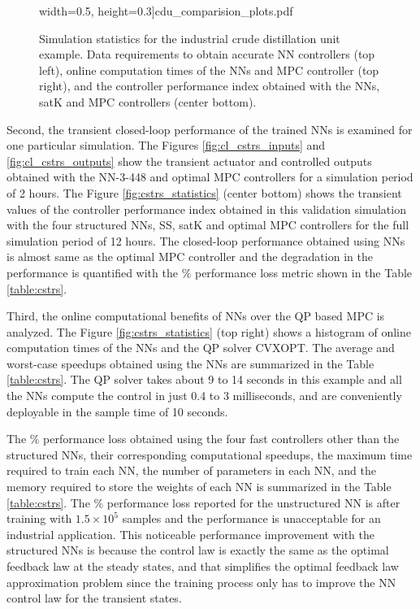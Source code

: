 \documentclass[preprint,5p, twocolumn, authoryear]{elsarticle}
\begin{document}
\begin{figure}[!h]
\begin{center}
        width=0.5\textwidth, 
        height=0.3\textheight]{cdu_comparision_plots.pdf}\end{center}
    \vspace{-0.2in}
    \caption{Simulation statistics for the industrial 
    crude distillation unit example. Data requirements to obtain accurate NN controllers (top left), online computation times of the NNs and 
    MPC controller (top right), 
    and the controller performance index obtained with the NNs, 
    satK and MPC controllers (center bottom).}
	\label{fig:cdu_statistics}
\end{figure}

Second, the transient closed-loop 
performance of the trained NNs is examined
for one particular simulation. The Figures 
\ref{fig:cl_cstrs_inputs} and \ref{fig:cl_cstrs_outputs}
show the transient actuator 
and controlled outputs obtained with the NN-3-448 and 
optimal MPC controllers for a simulation period of 2 hours.
The Figure \ref{fig:cstrs_statistics} (center bottom)
shows the transient values of the controller performance index
obtained in this validation simulation
with the four structured NNs, SS, satK 
and optimal MPC controllers for the full 
simulation period of 12 hours. The closed-loop 
performance obtained using NNs is almost same as the optimal MPC 
controller and the degradation in the performance 
is quantified with the $\%$ performance loss metric
shown in the Table \ref{table:cstrs}.

Third, the online computational benefits of NNs 
over the QP based MPC is analyzed. The Figure 
\ref{fig:cstrs_statistics} (top right)
shows a histogram of online computation times
of the NNs and the QP solver 
CVXOPT. The average and worst-case speedups
obtained using the NNs are summarized in the 
Table \ref{table:cstrs}. The QP solver takes 
about 9 to 14 seconds in this example and all the 
NNs compute the control in just 0.4 to 3 milliseconds, 
and are conveniently deployable in the 
sample time of 10 seconds.

The $\%$ performance loss 
obtained using the four fast controllers other 
than the structured NNs, 
their corresponding 
computational speedups, the maximum time required to 
train each NN, the number of parameters in each NN, 
and the memory required to store  
the weights of each NN is summarized in the 
Table \ref{table:cstrs}. The $\%$ performance loss 
reported for the unstructured
NN is after training with $1.5 \times 10^5$  
samples and the performance is unacceptable 
for an industrial application. 
This noticeable performance improvement with the
structured NNs is because the control law 
is exactly the same as the optimal feedback law
at the steady states, and that simplifies
the optimal feedback law approximation problem
since the training process only has to improve the 
NN control law for the transient states. 
\end{document}
